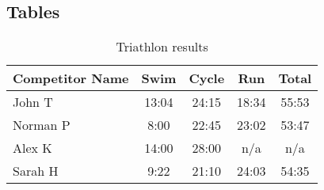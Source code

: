 \subsection{Tables}
\begin{table}[ht]
    \centering
    \begin{tabular}{l | c | c | c | c }
    Competitor Name & Swim & Cycle & Run & Total \\
    \hline \hline
    John T & 13:04 & 24:15 & 18:34 & 55:53 \\
    Norman P & 8:00 & 22:45 & 23:02 & 53:47\\
    Alex K & 14:00 & 28:00 & n/a & n/a\\
    Sarah H & 9:22 & 21:10 & 24:03 & 54:35
    \end{tabular}
    \caption{Triathlon results}
\end{table}
